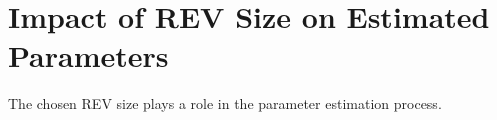 \section{Impact of REV Size on Estimated Parameters}
The chosen REV size plays a role in the parameter estimation process. 